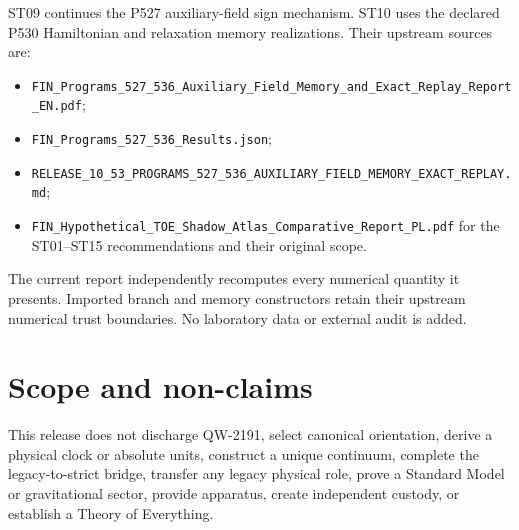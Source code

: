 \documentclass[11pt,a4paper]{article}
\begin{document}
ST09 continues the P527 auxiliary-field sign mechanism. ST10 uses the declared P530 Hamiltonian and relaxation memory realizations. Their upstream sources are:
\begin{itemize}
\item \texttt{FIN\_Programs\_527\_536\_Auxiliary\_Field\_Memory\_and\_Exact\_Replay\_Report\_EN.pdf};
\item \texttt{FIN\_Programs\_527\_536\_Results.json};
\item \texttt{RELEASE\_10\_53\_PROGRAMS\_527\_536\_AUXILIARY\_FIELD\_MEMORY\_EXACT\_REPLAY.md};
\item \texttt{FIN\_Hypothetical\_TOE\_Shadow\_Atlas\_Comparative\_Report\_PL.pdf} for the ST01--ST15 recommendations and their original scope.
\end{itemize}

The current report independently recomputes every numerical quantity it presents. Imported branch and memory constructors retain their upstream numerical trust boundaries. No laboratory data or external audit is added.

\section{Scope and non-claims}

This release does not discharge QW-2191, select canonical orientation, derive a physical clock or absolute units, construct a unique continuum, complete the legacy-to-strict bridge, transfer any legacy physical role, prove a Standard Model or gravitational sector, provide apparatus, create independent custody, or establish a Theory of Everything.
\end{document}
